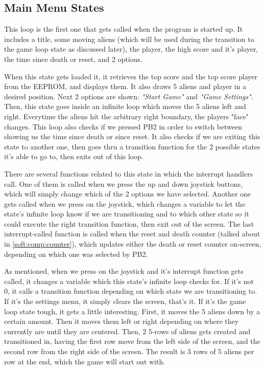 \documentclass[12pt, a4paper]{article}
\begin{document}
    \subsection{Main Menu States}
    This loop is the first one that gets called when the program is started up. It includes a title, some moving aliens (which will be used during the transition to the game loop state as discussed later), the player, the high score and it's player, the time since death or reset, and 2 options.
    
    When this state gets loaded it, it retrieves the top score and the top score player from the EEPROM, and displays them. It also draws 5 aliens and player in a desired position. Next 2 options are shown: \textit{"Start Game"} and \textit{"Game Settings"}. Then, this state goes inside an infinite loop which moves the 5 aliens left and right. Everytime the aliens hit the arbitrary right boundary, the players "face" changes. This loop also checks if we pressed PB2 in order to switch between showing us the time since death or since reset. It also checks if we are exiting this state to another one, then goes thru a transition function for the 2 possible states it's able to go to, then exits out of this loop. 
    
    There are several functions related to this state in which the interrupt handlers call. One of them is called when we press the up and down joystick buttons, which will simply change which of the 2 options we have selected. Another one gets called when we press on the joystick, which changes a variable to let the state's infinite loop know if we are transitioning and to which other state so it could execute the right transition function, then exit out of the screen. The last interrupt-called function is called when the reset and death counter (talked about in \cref{soft:comp:counter}), which updates either the death or reset counter on-screen, depending on which one was selected by PB2.
    
    As mentioned, when we press on the joystick and it's interrupt function gets called, it changes a variable which this state's infinite loop checks for. If it's not 0, it calls a transition function depending on which state we are transitioning to. If it's the settings menu, it simply clears the screen, that's it. If it's the game loop state tough, it gets a little interesting. First, it moves the 5 aliens down by a certain amount. Then it moves them left or right depending on where they currently are until they are centered. Then, 2 5-rows of aliens gets created and transitioned in, having the first row move from the left side of the screen, and the second row from the right side of the screen. The result is 3 rows of 5 aliens per row at the end, which the game will start out with.
    
\end{document}
